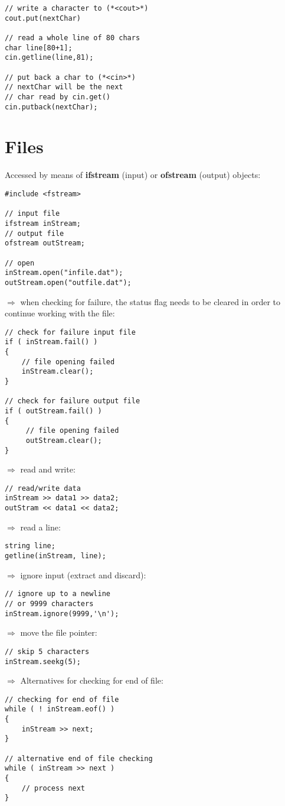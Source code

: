 \documentclass[10pt]{article}
\begin{document}
\begin{multicols*}{3}
\begin{lstlisting}
// write a character to (*<cout>*)
cout.put(nextChar)

// read a whole line of 80 chars
char line[80+1];
cin.getline(line,81);

// put back a char to (*<cin>*)
// nextChar will be the next
// char read by cin.get()
cin.putback(nextChar);
\end{lstlisting}
\columnbreak
%
%
\section*{Files}
\small
Accessed by means of \textbf{ifstream} (input) or
\textbf{ofstream} (output) objects:
\begin{lstlisting}
#include <fstream>

// input file
ifstream inStream;
// output file
ofstream outStream;

// open
inStream.open("infile.dat");
outStream.open("outfile.dat");
\end{lstlisting}
$\Rightarrow$ when checking for failure, the status flag needs to be cleared
in order to continue working with the file:
\begin{lstlisting}
// check for failure input file
if ( inStream.fail() )
{
    // file opening failed
    inStream.clear();
}

// check for failure output file
if ( outStream.fail() )
{
     // file opening failed
     outStream.clear();
}
\end{lstlisting}
$\Rightarrow$ read and write:
\begin{lstlisting}
// read/write data
inStream >> data1 >> data2;
outStram << data1 << data2;
\end{lstlisting}
$\Rightarrow$ read a line:
\begin{lstlisting}
string line;
getline(inStream, line);
\end{lstlisting}
$\Rightarrow$ ignore input (extract and discard):
\begin{lstlisting}
// ignore up to a newline
// or 9999 characters
inStream.ignore(9999,'\n');
\end{lstlisting}
$\Rightarrow$ move the file pointer:
\begin{lstlisting}
// skip 5 characters
inStream.seekg(5);
\end{lstlisting}
$\Rightarrow$ Alternatives for checking for end of file:
\begin{lstlisting}
// checking for end of file
while ( ! inStream.eof() )
{
    inStream >> next;
}

// alternative end of file checking
while ( inStream >> next )
{
    // process next
}



\end{lstlisting}
\end{multicols*}
\end{document}
